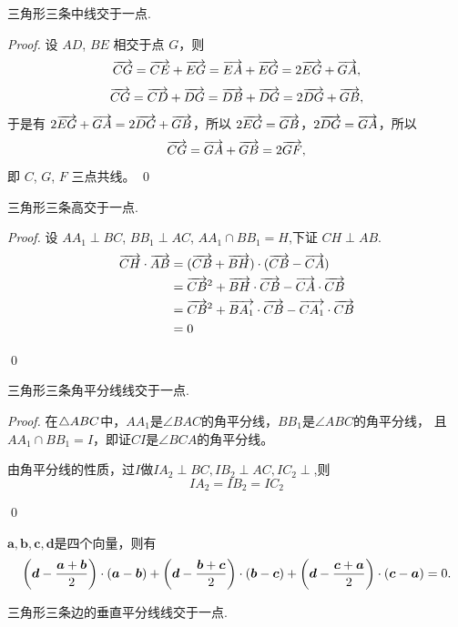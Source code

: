 \begin{proposition}
    三角形三条中线交于一点.
\end{proposition}
\begin{proof}
    设 $AD$, $BE$ 相交于点 $G$，则
\[
\overrightarrow{CG} = \overrightarrow{CE} + \overrightarrow{EG} = \overrightarrow{EA} + \overrightarrow{EG} = 2\overrightarrow{EG} + \overrightarrow{GA},
\]
\[
\overrightarrow{CG} = \overrightarrow{CD} + \overrightarrow{DG} = \overrightarrow{DB} + \overrightarrow{DG} = 2\overrightarrow{DG} + \overrightarrow{GB},
\]
于是有 $2\overrightarrow{EG} + \overrightarrow{GA} = 2\overrightarrow{DG} + \overrightarrow{GB}$，所以 $2\overrightarrow{EG} = \overrightarrow{GB}$，$2\overrightarrow{DG} = \overrightarrow{GA}$，所以
\[
\overrightarrow{CG} = \overrightarrow{GA} + \overrightarrow{GB} = 2\overrightarrow{GF},
\]
即 $C$, $G$, $F$ 三点共线。
\qed
\end{proof}
\begin{proposition}
    三角形三条高交于一点.
\end{proposition}
\begin{proof}
    设 $AA_1 \perp BC$, $BB_1 \perp AC$, $AA_1 \cap BB_1 = H$,下证 $CH \perp AB$.
\begin{align*}
    \overrightarrow{CH} \cdot \overrightarrow{AB}&= (\overrightarrow{CB} + \overrightarrow{BH}) \cdot (\overrightarrow{CB} - \overrightarrow{CA})\\
                         &= \overrightarrow{CB}^2 + \overrightarrow{BH} \cdot \overrightarrow{CB} - \overrightarrow{CA} \cdot \overrightarrow{CB}\\
                         &= \overrightarrow{CB}^2 + \overrightarrow{BA_1} \cdot \overrightarrow{CB} - \overrightarrow{CA_1} \cdot \overrightarrow{CB}\\
                         &= 0 
\end{align*}

\qed

\end{proof}
\begin{proposition}
    三角形三条角平分线线交于一点.
\end{proposition}
\begin{proof}
    在\(\triangle ABC\)中，\(AA_1\)是\(\angle BAC\)的角平分线，\(BB_1\)是\(\angle ABC\)的角平分线，
    且\(AA_1\cap BB_1=I\)，即证\(CI\)是\(\angle BCA\)的角平分线。

    由角平分线的性质，过\(I\)做\(IA_2\perp BC,IB_2\perp AC,IC_2\perp\),则
    \[IA_2=IB_2=IC_2\]

    \qed
\end{proof}
\begin{lemma}
    \(\boldsymbol{a},\boldsymbol{b},\boldsymbol{c},\boldsymbol{d}\)是四个向量，则有
    \[
\left(\boldsymbol{d} - \frac{\boldsymbol{a}+\boldsymbol{b}}{2}\right) \cdot (\boldsymbol{a}-\boldsymbol{b}) + \left(\boldsymbol{d}-\frac{\boldsymbol{b}+\boldsymbol{c}}{2}\right) \cdot (\boldsymbol{b}-\boldsymbol{c}) + \left(
    \boldsymbol{d} - \frac{\boldsymbol{c}+\boldsymbol{a}}{2}\right) \cdot (\boldsymbol{c}-\boldsymbol{a}) = 0.
\]
\end{lemma}
\begin{proposition}
    三角形三条边的垂直平分线线交于一点.
\end{proposition}

